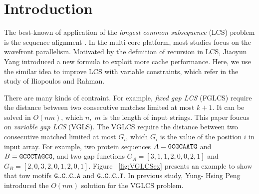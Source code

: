 \section{Introduction} %
\label{sec:Introduction}

The best-known of application of the \emph{longest common subsequence}
(LCS) problem \cite{Hirschberg1975ALS} is the sequence alignment
\cite{mount2001bioinformatics, Ann2010EfficientAF}.  In the multi-core
platform, most studies focus on the wavefront parallelism. Motivated
by the definition of recursion in LCS, Jiaoyun Yang\cite{Yang2010AnEP}
introduced a new formula to exploit more cache performance. Here, we
use the similar idea to improve LCS with variable constraints, which
refer in the study of Iliopoulos and
Rahman\cite{Rahman2006AlgorithmsFC}.

\iffalse
最長共同子序列 (\emph{longest common subsequence}, LCS) 廣泛地使用在各個應用上。
在多核心平台下，大多數的研究專注於如何高效率地在波前平行 (wavefront parallelism)，
而 Jiaoyun Yang ~\cite{jiaoyun} 提出的論文中改變一般的 LCS 遞迴定義以得到更好快取使用率。
在這篇論文中，針對在 Iliopoulos 和 Rahman ~\cite{iliopoulos} 提及的約束條件下的 LCS 問題使用相關的想法來改善效能。
\fi

There are many kinds of contraint.  For example, \emph{fixed gap LCS}
(FGLCS) require the distance between two consecutive matches limited
at most $k+1$.  It can be solved in $O(nm)$, which $n, \; m$ is the
length of input strings. This paper foucus on \emph{variable gap LCS}
(VGLS).  The VGLCS require the distance between two consecutive
matched limited at most $G_i$, which $G_i$ is the value of the
position $i$ in input array. For example, two protein sequences $A =
\tt{GCGCAATG}$ and $B = \tt{GCCCTAGCG}$, and two gap functions $G_A =
[3, 1, 1, 2, 0, 0, 2, 1]$ and $G_B = [2, 0, 3, 2, 0, 1, 2, 0, 1]$.
Figure ~\ref{fig:VGLCSex} presents an example to show that tow motifs
$\tt{G..C..C..A}$ and $\tt{G..C..C..T}$.  In previous study, Yung-
Hsing Peng \cite{Yang2010AnEP} introduced the $O(nm)$ solution for the
VGLCS problem.

\iffalse
在約束條件下的 LCS 中，如 \emph{fixed gap LCS } (FGLCS)要求任兩個挑選的距離在相對應的另一個字串中相等，
同時距離最大為 $k+1$，可在時間複雜度在 $O(nm)$ 內解決，其中 $n$, $m$ 分別為兩個輸入的字串長度。
我們將在這篇論文針對 \emph{variable gap LCS} (VGLCS) 進行探討。
在 VGLCS 中，對各個不同的位置提供約束限制，如目前給定兩個字串 $A = \tt{GCGCAATG}$, 
$B = \tt{GCCCTAGCG}$，各自的約束限制為 $G_A = [3, 1, 1, 2, 0, 0, 2, 1]$ 
和 $G_B = [2, 0, 3, 2, 0, 1, 2, 0, 1]$，其中 $G_A(i)$ 表示當挑選第 $i$ 個位置時，與前一個挑選的位置最多差 $G_A(i)+1$，同理 $G_B(i)$；
我們可以得到兩組 VGLCS 的解 $\tt{G..C..C..A}$ 和 $\tt{G..C..C..T}$，挑選的方式如圖 ~\ref{fig:VGLCSex}。
在 Yung-Hsing Peng ~\cite{yunghsing} 的論文已對 VGLCS 提出易於實作的 $O(nm \alpha(n))$ 和理論 $O(nm)$ 的解法。
\fi

